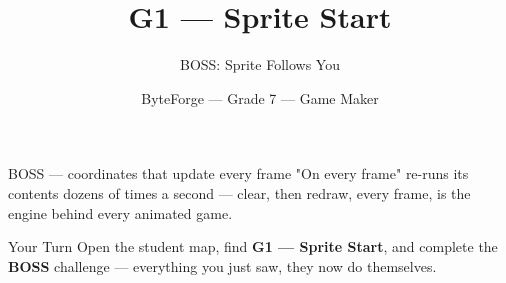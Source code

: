 \documentclass[aspectratio=169]{beamer}
\title{G1 — Sprite Start}
\subtitle{BOSS: Sprite Follows You}
\author{ByteForge --- Grade 7 --- Game Maker}
\date{}
\begin{document}
\begin{frame}
    \titlepage
\end{frame}

\begin{frame}{BOSS — coordinates that update every frame}
    \Large
    "On every frame" re-runs its contents dozens of times a second — clear, then redraw, every frame, is the engine behind every animated game.

    \begin{center}
    \end{center}
\end{frame}

\begin{frame}{Your Turn}
    \Large
    Open the student map, find \textbf{G1 — Sprite Start}, and complete
    the \textbf{BOSS} challenge --- everything you just saw, they now do themselves.
\end{frame}
\end{document}
